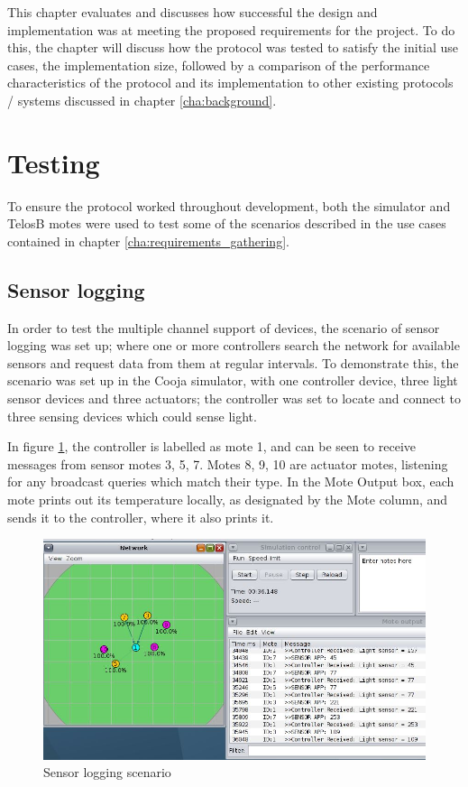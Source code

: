 This chapter evaluates and discusses how successful the design and implementation was at meeting the proposed requirements for the project. To do this, the chapter will discuss how the protocol was tested to satisfy the initial use cases, the implementation size, followed by a comparison of the performance characteristics of the protocol and its implementation to other existing protocols / systems discussed in chapter \ref{cha:background}.


\section{Testing} %
\label{sec:testing}
To ensure the protocol worked throughout development, both the simulator and TelosB motes were used to test some of the scenarios described in the use cases contained in chapter \ref{cha:requirements_gathering}.
\subsection{Sensor logging} %
\label{sub:sensor_logging}
In order to test the multiple channel support of devices, the scenario of sensor logging was set up; where one or more controllers search the network for available sensors and request data from them at regular intervals.
To demonstrate this, the scenario was set up in the Cooja simulator, with one controller device, three light sensor devices and three actuators; the controller was set to locate and connect to three sensing devices which could sense light.

In figure \ref{fig:logtest}, the controller is labelled as mote 1, and can be seen to receive messages from sensor motes 3, 5, 7. Motes 8, 9, 10 are actuator motes, listening for any broadcast queries which match their type. In the Mote Output box, each mote prints out its temperature locally, as designated by the Mote column, and sends it to the controller, where it also prints it.

\begin{figure}[h]
\centering
\includegraphics[scale=0.5]{evaluation/img/logTest.jpg}
\caption{Sensor logging scenario}
\label{fig:logtest}
\end{figure}  

